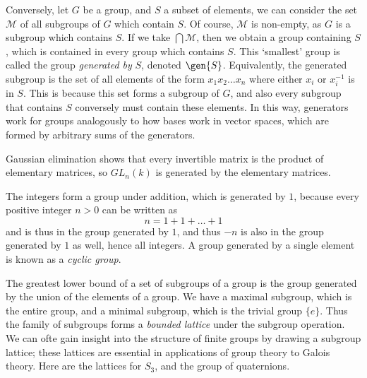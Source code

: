 Conversely, let $G$ be a group, and $S$ a subset of elements, we can consider the set $\mathcal{M}$ of all subgroups of $G$ which contain $S$. Of course, $\mathcal{M}$ is non-empty, as $G$ is a subgroup which contains $S$. If we take $\bigcap \mathcal{M}$, then we obtain a group containing $S$, which is contained in every group which contains $S$. This `smallest' group is called the group \emph{generated by} $S$, denoted $\gen{S}$. Equivalently, the generated subgroup is the set of all elements of the form $x_1 x_2 \dots x_n$ where either $x_i$ or $x_i^{-1}$ is in $S$. This is because this set forms a subgroup of $G$, and also every subgroup that contains $S$ conversely must contain these elements. In this way, generators work for groups analogously to how bases work in vector spaces, which are formed by arbitrary sums of the generators.

\begin{example}
    Gaussian elimination shows that every invertible matrix is the product of elementary matrices, so $GL_n(k)$ is generated by the elementary matrices.
\end{example}

\begin{example}
    The integers form a group under addition, which is generated by $1$, because every positive integer $n > 0$ can be written as
    \[ n = 1 + 1 + \dots + 1  \]
    and is thus in the group generated by $1$, and thus $-n$ is also in the group generated by $1$ as well, hence all integers. A group generated by a single element is known as a \emph{cyclic group}.
\end{example}


The greatest lower bound of a set of subgroups of a group is the group generated by the union of the elements of a group. We have a maximal subgroup, which is the entire group, and a minimal subgroup, which is the trivial group $\{ e \}$. Thus the family of subgroups forms a \emph{bounded lattice} under the subgroup operation. We can ofte gain insight into the structure of finite groups by drawing a subgroup lattice; these lattices are essential in applications of group theory to Galois theory. Here are the lattices for $S_3$, and the group of quaternions.

